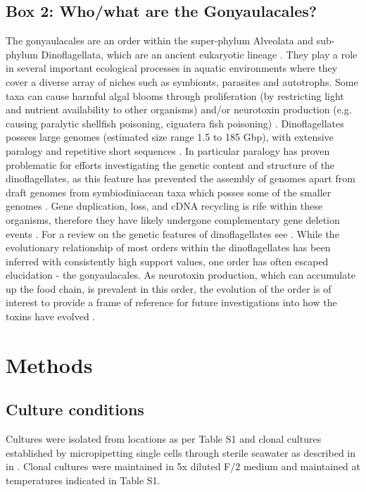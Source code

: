 \documentclass[fleqn,10pt,lineno]{wlpeerj} %
\begin{document}
\subsection*{Box 2: Who/what are the Gonyaulacales?}
\label{sec:dinobox}
The gonyaulacales are an order within the super-phylum Alveolata and sub-phylum Dinoflagellata, which are an ancient eukaryotic lineage \citep{moldowan1998biogeochemical}. 
They play a role in several important ecological processes in aquatic environments where they cover a diverse array of niches such as symbionts, parasites and autotrophs. 
Some taxa can cause harmful algal blooms through proliferation (by restricting light and nutrient availability to other organisms) and/or neurotoxin production (e.g. causing paralytic shellfish poisoning, ciguatera fish poisoning) \citep{murray2016unravelling}.
Dinoflagellates possess large genomes (estimated size range 1.5 to 185 Gbp), with extensive paralogy and repetitive short sequences  \citep{casabianca2017genome}. 
In particular paralogy has proven problematic for efforts investigating the genetic content and structure of the dinoflagellates, as this feature has prevented the assembly of genomes apart from draft genomes from symbiodiniacean taxa which posses some of the smaller genomes \citep{shoguchi2013draft,lin2015symbiodinium,lajeunesse2018systematic}. 
Gene duplication, loss, and cDNA recycling is rife within these organisms, therefore they have likely undergone complementary gene deletion events \citep{slamovits2008widespread,murray2015gene,shoguchi2018two}. 
For a review on the genetic features of dinoflagellates see \cite{murray2016unravelling}.
While the evolutionary relationship of most orders within the dinoflagellates has been inferred with consistently high support values, one order has often escaped elucidation - the gonyaulacales. 
As neurotoxin production, which can accumulate up the food chain, is prevalent in this order, the evolution of the order is of interest to provide a frame of reference for future investigations into how the toxins have evolved \citep{shalchian2006combined,zhang2007three,saldarriaga2004molecular,hoppenrath2010dinoflagellate,murray2005improving}. 

\section*{Methods}
\subsection*{Culture conditions}
Cultures were isolated from locations as per Table S1 and clonal cultures established by micropipetting single cells through sterile seawater as described in in \citep{kretzschmar2017characterization}. 
Clonal cultures were maintained in 5x diluted F/2 medium \citep{holmes1991strain} and maintained at temperatures indicated in Table S1. 
\end{document}
